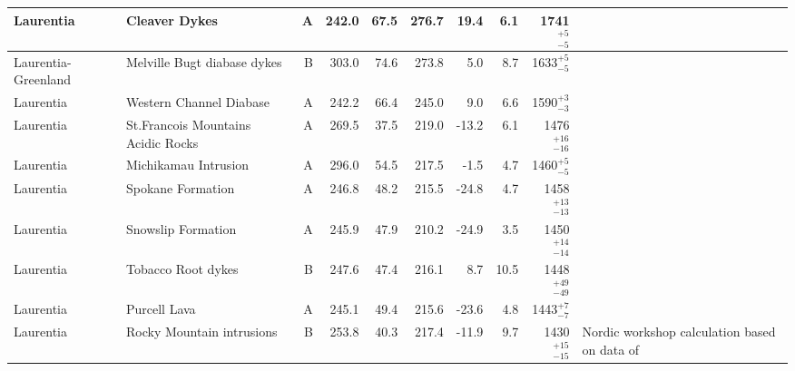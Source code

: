 \begin{longtable}{p{1 in}p{1 in}rrrrrrrp{1.5 in}}
                     Laurentia &                                    Cleaver Dykes &      A &     242.0 &      67.5 & 276.7 &  19.4 &       6.1 &     1741$^{+5}_{-5}$ &                                  \cite{Irving2004a} \\ \hline
           Laurentia-Greenland &                      Melville Bugt diabase dykes &      B &     303.0 &      74.6 & 273.8 &   5.0 &       8.7 &     1633$^{+5}_{-5}$ &                                  \cite{Halls2011a} \\ \hline
                     Laurentia &                          Western Channel Diabase &      A &     242.2 &      66.4 & 245.0 &   9.0 &       6.6 &     1590$^{+3}_{-3}$ &                                 \cite{Irving1972a} \\ \hline
                     Laurentia &               St.Francois Mountains Acidic Rocks &      A &     269.5 &      37.5 & 219.0 & -13.2 &       6.1 &   1476$^{+16}_{-16}$ &                                  \cite{Meert2002b} \\ \hline
                     Laurentia &                             Michikamau Intrusion &      A &     296.0 &      54.5 & 217.5 &  -1.5 &       4.7 &     1460$^{+5}_{-5}$ &                                 \cite{Emslie1976a} \\ \hline
                     Laurentia &                                Spokane Formation &      A &     246.8 &      48.2 & 215.5 & -24.8 &       4.7 &   1458$^{+13}_{-13}$ &                                 \cite{Elston2002a} \\ \hline
                     Laurentia &                               Snowslip Formation &      A &     245.9 &      47.9 & 210.2 & -24.9 &       3.5 &   1450$^{+14}_{-14}$ &                                 \cite{Elston2002a} \\ \hline
                     Laurentia &                               Tobacco Root dykes &      B &     247.6 &      47.4 & 216.1 &   8.7 &      10.5 &   1448$^{+49}_{-49}$ &                                 \cite{Harlan2008a} \\ \hline
                     Laurentia &                                     Purcell Lava &      A &     245.1 &      49.4 & 215.6 & -23.6 &       4.8 &     1443$^{+7}_{-7}$ &                                 \cite{Elston2002a} \\ \hline
                     Laurentia &                        Rocky Mountain intrusions &      B &     253.8 &      40.3 & 217.4 & -11.9 &       9.7 &   1430$^{+15}_{-15}$ &  Nordic workshop calculation based on data of \cite{Harlan1994a,Harlan1998a} \\ \hline

\end{longtable}
